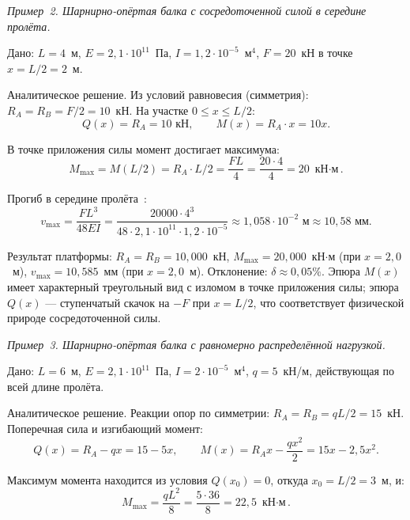 \textit{Пример~2. Шарнирно-опёртая балка с сосредоточенной силой в середине пролёта.}

Дано: $L = 4$~м, $E = 2{,}1 \cdot 10^{11}$~Па, $I = 1{,}2 \cdot 10^{-5}$~м$^4$, $F = 20$~кН в точке $x = L/2 = 2$~м.

Аналитическое решение. Из условий равновесия (симметрия): $R_A = R_B = F/2 = 10$~кН. На участке $0 \leq x \leq L/2$:
\begin{equation}
  Q(x) = R_A = 10 \text{ кН}, \qquad M(x) = R_A \cdot x = 10 x.
  \label{eq:ex2_left}
\end{equation}

В точке приложения силы момент достигает максимума:
\begin{equation}
  M_{\max} = M(L/2) = R_A \cdot L/2 = \frac{F L}{4} = \frac{20 \cdot 4}{4} = 20 \text{ кН$\cdot$м}.
  \label{eq:ex2_Mmax}
\end{equation}

Прогиб в середине пролёта~\cite{gere2018}:
\begin{equation}
  v_{\max} = \frac{F L^3}{48 E I} = \frac{20000 \cdot 4^3}{48 \cdot 2{,}1 \cdot 10^{11} \cdot 1{,}2 \cdot 10^{-5}} \approx 1{,}058 \cdot 10^{-2} \text{ м} \approx 10{,}58 \text{ мм}.
  \label{eq:ex2_vmax}
\end{equation}

Результат платформы: $R_A = R_B = 10{,}000$~кН, $M_{\max} = 20{,}000$~кН$\cdot$м (при $x = 2{,}0$~м), $v_{\max} = 10{,}585$~мм (при $x = 2{,}0$~м). Отклонение: $\delta \approx 0{,}05\%$. Эпюра $M(x)$ имеет характерный треугольный вид с изломом в точке приложения силы; эпюра $Q(x)$ --- ступенчатый скачок на $-F$ при $x = L/2$, что соответствует физической природе сосредоточенной силы.

\textit{Пример~3. Шарнирно-опёртая балка с равномерно распределённой нагрузкой.}

Дано: $L = 6$~м, $E = 2{,}1 \cdot 10^{11}$~Па, $I = 2 \cdot 10^{-5}$~м$^4$, $q = 5$~кН/м, действующая по всей длине пролёта.

Аналитическое решение. Реакции опор по симметрии: $R_A = R_B = q L / 2 = 15$~кН. Поперечная сила и изгибающий момент:
\begin{equation}
  Q(x) = R_A - q x = 15 - 5 x, \qquad M(x) = R_A x - \frac{q x^2}{2} = 15 x - 2{,}5 x^2.
  \label{eq:ex3_QM}
\end{equation}

Максимум момента находится из условия $Q(x_0) = 0$, откуда $x_0 = L/2 = 3$~м, и:
\begin{equation}
  M_{\max} = \frac{q L^2}{8} = \frac{5 \cdot 36}{8} = 22{,}5 \text{ кН$\cdot$м}.
  \label{eq:ex3_Mmax}
\end{equation}

